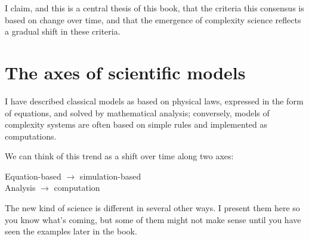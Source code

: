 \documentclass[12pt]{book}
\theoremstyle{exercise}
\begin{document}
I claim, and this is a central thesis of this book, that the
criteria this consensus is based on change over time, and that
the emergence of complexity science reflects a gradual shift in
these criteria.


\section{The axes of scientific models}

I have described classical models as based on physical laws, expressed
in the form of equations, and solved by mathematical analysis;
conversely, models of complexity systems are often based on simple
rules and implemented as computations.


We can think of this trend as a shift over time along two axes:

\begin{description}

\item[Equation-based $\rightarrow$ simulation-based] \quad

\item[Analysis $\rightarrow$ computation] \quad

\end{description}

The new kind of science is different in several other
ways.  I present them here so you know what's coming, but some of them
might not make sense until you have seen the examples later in the
book.
\end{document}
